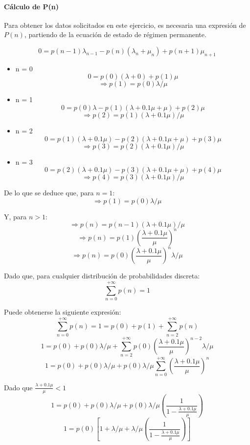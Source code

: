 \documentclass{article}
\begin{document}
   \paragraph{Cálculo de P(n)}
   Para obtener los datos solicitados en este ejercicio, es necesaria una expresión de $P(n)$, partiendo de la ecuación de estado de régimen permanente.

      $$0 = p(n-1) \lambda_{n-1} - p(n) (\lambda_n + \mu_n) + p(n+1) \mu_{n+1}$$

      \begin{itemize}
         \item{n = 0}
            $$0 = p(0) (\lambda + 0) + p(1) \mu$$
            $$\Rightarrow p(1) = p(0) \lambda / \mu$$
         \item{n = 1}
            $$0 = p(0) \lambda - p(1) (\lambda + 0.1 \mu + \mu) + p(2) \mu$$
            $$\Rightarrow p(2) = p(1) (\lambda + 0.1 \mu) / \mu$$
         \item{n = 2}
            $$0 = p(1) (\lambda + 0.1 \mu) - p(2) (\lambda + 0.1 \mu + \mu) + p(3) \mu$$
            $$\Rightarrow p(3) = p(2) (\lambda + 0.1 \mu) / \mu$$
         \item{n = 3}
            $$0 = p(2) (\lambda + 0.1 \mu) - p(3) (\lambda + 0.1 \mu + \mu) + p(4) \mu$$
            $$\Rightarrow p(4) = p(3) (\lambda + 0.1 \mu) / \mu$$
      \end{itemize}

   De lo que se deduce que, para $n = 1$:
      $$\Rightarrow p(1) = p(0) \lambda / \mu$$

   Y, para $n > 1$:
      $$\Rightarrow p(n) = p(n - 1) (\lambda + 0.1 \mu ) / \mu$$
      $$\Rightarrow p(n) = p(1) (\frac{\lambda + 0.1 \mu}{\mu})^n$$
      $$\Rightarrow p(n) = p(0) (\frac{\lambda + 0.1 \mu}{\mu})^n \lambda / \mu$$

   Dado que, para cualquier distribución de probabilidades discreta:
      $$\sum_{n=0}^{+\infty} p(n) = 1$$

   Puede obtenerse la siguiente expresión:
      $$\sum_{n=0}^{+\infty} p(n) = 1 = p(0) + p(1) + \sum_{n=2}^{+\infty} p(n)$$
      $$1 = p(0) + p(0) \lambda / \mu + \sum_{n=2}^{+\infty} p(0) (\frac{\lambda + 0.1 \mu}{\mu})^{n-2} \lambda / \mu$$
      $$1 = p(0) + p(0) \lambda / \mu + p(0) \lambda / \mu \sum_{n=0}^{+\infty} (\frac{\lambda + 0.1 \mu}{\mu})^n$$

   Dado que $\frac{\lambda + 0.1 \mu}{\mu} < 1$
      $$1 = p(0) + p(0) \lambda / \mu + p(0) \lambda / \mu (\frac{1}{1 - \frac{\lambda + 0.1\mu}{\mu}})$$
      $$1 = p(0) [1 + \lambda / \mu + \lambda / \mu (\frac{1}{1 - \frac{\lambda + 0.1\mu}{\mu}})]$$
\end{document}
